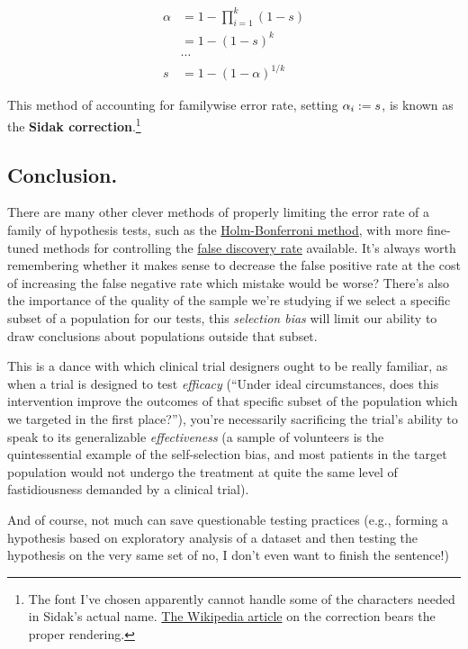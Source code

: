 \documentclass[../main/main.tex]{subfiles}
\begin{document}
\[\begin{split}
  \alpha &= 1 - \prod_{i=1}^{k} (1 - s) \\
   &= 1 - (1 - s)^k \\
   &\cdots \\
   s &= 1 - \left(1 - \alpha\right)^{1/k}
\end{split}
\]

This method of accounting for familywise error rate,
setting \(\alpha_i := s\),
is known as the
\textbf{Sidak correction}.\footnote{
  The font I've chosen apparently cannot handle some
  of the characters needed in Sidak's actual name.
  \href{https://en.wikipedia.org/wiki/\%C5\%A0id\%C3\%A1k_correction}{The Wikipedia article}
  on the correction bears the proper rendering.
}

\subsection{Conclusion.}
There are many other clever methods of properly
limiting the error rate of a family of hypothesis tests,
such as the \href{https://en.wikipedia.org/wiki/Holm%E2%80%93Bonferroni_method}{Holm-Bonferroni method}, with more fine-tuned
methods for controlling the \href{https://en.wikipedia.org/wiki/False_discovery_rate}{false discovery rate}
available.
It's always worth remembering whether it makes
sense to decrease the false positive rate at the cost
of increasing the false negative rate \textemdash{}
which mistake would be worse?
There's also the importance of the quality of the
sample we're studying \textemdash{} if we select a
specific subset of a population for our tests,
this \emph{selection bias} will limit our ability
to draw conclusions about populations outside
that subset.

This is a dance
with which clinical trial designers
ought to be really familiar, as 
when a trial is designed to test \emph{efficacy} 
(``Under ideal circumstances, does this intervention
improve the outcomes of that specific subset of
the population which we targeted in the first place?''),
you're necessarily sacrificing the trial's ability
to speak to its generalizable \emph{effectiveness}
(a sample of volunteers is the quintessential example
of the self-selection bias, and most patients in the
target population would not undergo the treatment 
at quite the same level of fastidiousness 
demanded by a clinical trial).

And of course, not much can save questionable
testing practices (e.g., forming a hypothesis based
on exploratory analysis of a dataset and then
testing the hypothesis on the very same set of
\textemdash{} 
no, I don't even want to finish the sentence!)
\end{document}
